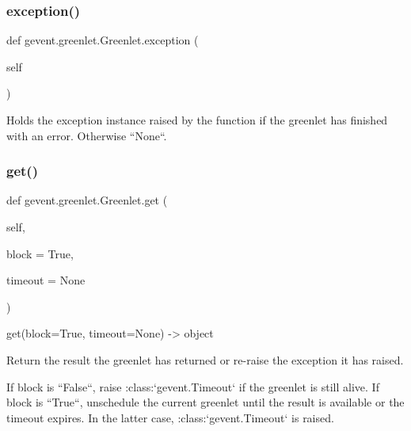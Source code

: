 \subsubsection{\texorpdfstring{exception()}{exception()}}
{\footnotesize\ttfamily def gevent.\+greenlet.\+Greenlet.\+exception (\begin{DoxyParamCaption}\item[{}]{self }\end{DoxyParamCaption})}

\begin{DoxyVerb}Holds the exception instance raised by the function if the
greenlet has finished with an error. Otherwise ``None``.
\end{DoxyVerb}
 \mbox{\label{classgevent_1_1greenlet_1_1_greenlet_a7bb59bb6362b31d8196b490408d6badf}} 
\subsubsection{\texorpdfstring{get()}{get()}}
{\footnotesize\ttfamily def gevent.\+greenlet.\+Greenlet.\+get (\begin{DoxyParamCaption}\item[{}]{self,  }\item[{}]{block = {\ttfamily True},  }\item[{}]{timeout = {\ttfamily None} }\end{DoxyParamCaption})}

\begin{DoxyVerb}get(block=True, timeout=None) -> object

Return the result the greenlet has returned or re-raise the
exception it has raised.

If block is ``False``, raise :class:`gevent.Timeout` if the
greenlet is still alive. If block is ``True``, unschedule the
current greenlet until the result is available or the timeout
expires. In the latter case, :class:`gevent.Timeout` is
raised.
\end{DoxyVerb}
 \mbox{\label{classgevent_1_1greenlet_1_1_greenlet_a90e26227545397efc018cd7754d48547}} 
